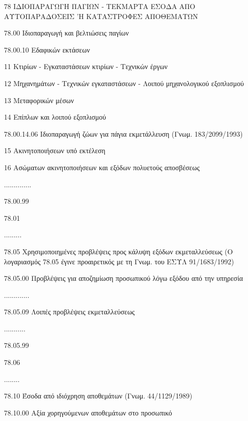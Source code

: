 \documentclass[A4,10pt,greek]{book}
\begin{document}
78    ΙΔΙΟΠΑΡΑΓΩΓΗ ΠΑΓΙΩΝ - ΤΕΚΜΑΡΤΑ ΕΣΟΔΑ ΑΠΟ
        ΑΥΤΟΠΑΡΑΔΟΣΕΙΣ 'Η ΚΑΤΑΣΤΡΟΦΕΣ ΑΠΟΘΕΜΑΤΩΝ 

        78.00    Ιδιοπαραγωγή και βελτιώσεις παγίων 

                     78.00.10    Εδαφικών εκτάσεων 

                               11    Κτιρίων - Εγκαταστάσεων κτιρίων - Τεχνικών έργων 

                               12    Μηχανημάτων - Τεχνικών εγκαταστάσεων - Λοιπού
                                       μηχανολογικού εξοπλισμού 

                               13    Μεταφορικών μέσων 

                               14    Επίπλων και λοιπού εξοπλισμού 

                     78.00.14.06    Ιδιοπαραγωγή ζώων για πάγια εκμετάλλευση
                                           (Γνωμ. 183/2099/1993) 

                               15    Ακινητοποιήσεων υπό εκτέλεση 

                               16    Ασώματων ακινητοποιήσεων και εξόδων πολυετούς
                                       αποσβέσεως 

                     ..............

                     78.00.99

        78.01

         .........

         78.05    Χρησιμοποιημένες προβλέψεις προς κάλυψη εξόδων εκμεταλλεύσεως
                      (Ο λογαριασμός 78.05 έγινε προαιρετικός με τη Γνωμ. του ΕΣΥΛ 91/1683/1992)

                     78.05.00    Προβλέψεις για αποζημίωση προσωπικού λόγω εξόδου από την
                                       υπηρεσία

                     .............

                     78.05.09    Λοιπές προβλέψεις εκμεταλλεύσεως

                     ...........

                     78.05.99

        78.06

        ........

        78.10    Έσοδα από ιδιόχρηση αποθεμάτων (Γνωμ. 44/1129/1989) 

                     78.10.00    Αξία χορηγούμενων αποθεμάτων στο προσωπικό
\end{document}
